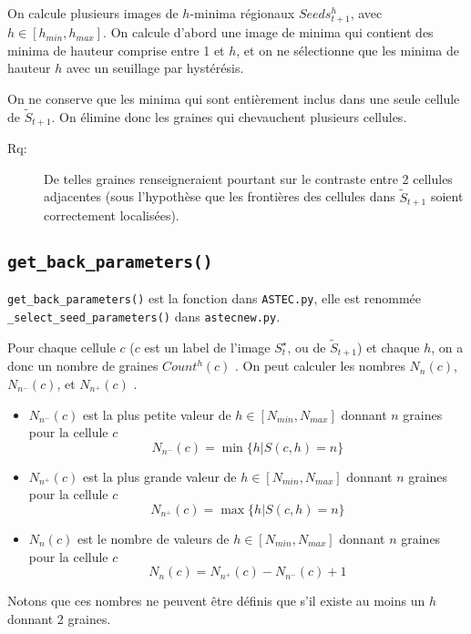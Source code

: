 \documentclass{article}
\newenvironment{remarque}{\color{red}\begin{description}\item[Rq:]}
{\end{description}\color{black}}
\begin{document}
On calcule plusieurs images de $h$-minima r\'egionaux $Seeds^{h}_{t+1}$, avec $h \in [h_{min}, h_{max}]$. On calcule d'abord une image de minima qui contient des minima de hauteur comprise entre 1 et $h$, et on ne s\'electionne que les minima de hauteur $h$ avec un seuillage par hyst\'er\'esis. 

On ne conserve que les minima qui sont enti\`erement inclus dans une seule cellule de $\tilde{S}_{t+1}$. On \'elimine donc les graines qui chevauchent plusieurs cellules. 
\begin{remarque}
De telles graines renseigneraient pourtant sur le contraste entre 2 cellules adjacentes (sous l'hypoth\`ese que les fronti\`eres des cellules dans $\tilde{S}_{t+1}$ soient correctement localis\'ees).
\end{remarque}

\subsection{\texttt{get\_back\_parameters()}}

\verb|get_back_parameters()| est la fonction dans \verb|ASTEC.py|, elle est renomm\'ee \verb|_select_seed_parameters()| dans \verb|astecnew.py|.

Pour chaque cellule $c$ ($c$ est un label de l'image $S^{\star}_t$, ou de $\tilde{S}_{t+1}$) et chaque $h$, on a donc un nombre de graines $Count^{h}(c)$ \cite[figure 2.9, page 72]{guignard:tel-01278725}. 
On peut calculer les nombres $N_{n}(c)$, $N_{n^{-}}(c)$, et $N_{n^{+}}(c)$  \cite[section 2.3.3.5, page 71]{guignard:tel-01278725}. 
\begin{itemize}
\itemsep -0.5ex
\item $N_{n^{-}}(c)$ est la plus petite valeur de $h \in  [N_{min}, N_{max}]$ donnant $n$ graines pour la cellule $c$
\begin{displaymath}
N_{n^{-}}(c) = \min \{ h | S(c,h) = n \}
\end{displaymath}
\item $N_{n^{+}}(c)$ est la plus grande valeur de $h \in  [N_{min}, N_{max}]$ donnant $n$ graines pour la cellule $c$
\begin{displaymath}
N_{n^{+}}(c) = \max \{ h | S(c,h) = n \}
\end{displaymath}
\item $N_{n}(c)$ est le nombre de  valeurs de $h \in  [N_{min}, N_{max}]$ donnant $n$ graines pour la cellule $c$
\begin{displaymath}
N_{n}(c) = N_{n^{+}}(c) - N_{n^{-}}(c) + 1
\end{displaymath}
\end{itemize}
Notons que ces nombres ne peuvent \^etre d\'efinis que s'il existe au moins un $h$ donnant 2 graines.
\end{document}
